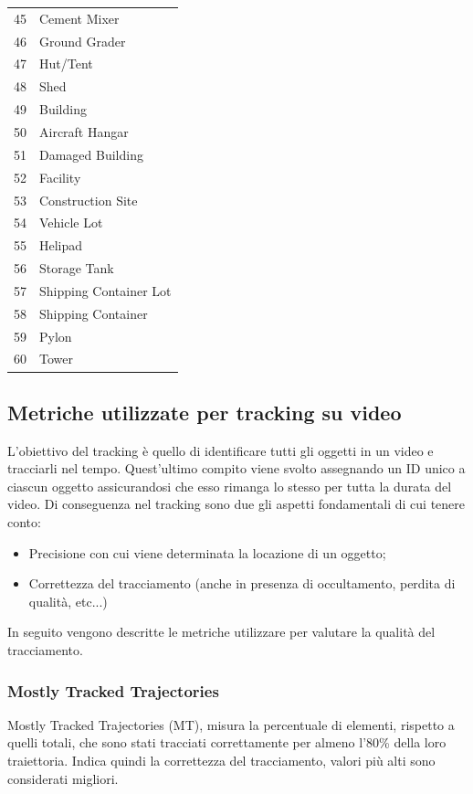 \begin{center}
\begin{longtable}{|c|l|}
45 & Cement Mixer \\
46 & Ground Grader \\
47 & Hut/Tent \\
48 & Shed \\
49 & Building \\
50 & Aircraft Hangar \\
51 & Damaged Building \\
52 & Facility \\
53 & Construction Site \\
54 & Vehicle Lot \\
55 & Helipad \\
56 & Storage Tank \\
57 & Shipping Container Lot \\
58 & Shipping Container \\
59 & Pylon \\
60 & Tower \\
\end{longtable}
\end{center}

\subsection{Metriche utilizzate per tracking su video}
L'obiettivo del tracking è quello di identificare tutti gli oggetti in un video e tracciarli nel tempo. Quest'ultimo compito viene svolto assegnando un ID unico a ciascun oggetto assicurandosi che esso rimanga lo stesso per tutta la durata del video. Di conseguenza nel tracking sono due gli aspetti fondamentali di cui tenere conto:
\begin{itemize}
\item Precisione con cui viene determinata la locazione di un oggetto;
\item Correttezza del tracciamento (anche in presenza di occultamento, perdita di qualità, etc...)
\end{itemize}
In seguito vengono descritte le metriche utilizzare per valutare la qualità del tracciamento.

\subsubsection{Mostly Tracked Trajectories}
Mostly Tracked Trajectories (MT), misura la percentuale di elementi, rispetto a quelli totali, che sono stati tracciati correttamente per almeno l'80\% della loro traiettoria. Indica quindi la correttezza del tracciamento, valori più alti sono considerati migliori.
